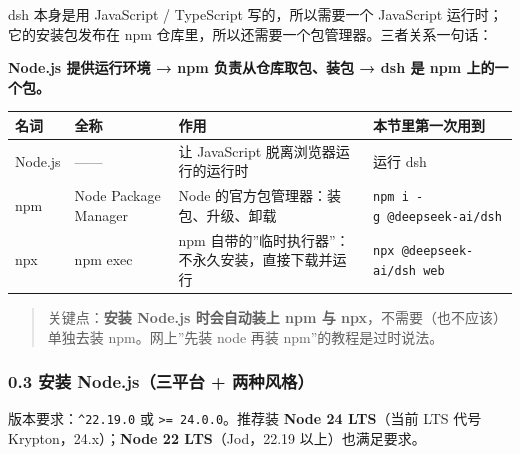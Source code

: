 dsh 本身是用 JavaScript / TypeScript 写的，所以需要一个 JavaScript
运行时；它的安装包发布在 npm
仓库里，所以还需要一个包管理器。三者关系一句话：

\textbf{Node.js 提供运行环境 → npm 负责从仓库取包、装包 → dsh 是 npm
上的一个包。}

{\def\LTcaptype{none} %
\begin{longtable}[]{@{}
  >{\raggedright\arraybackslash}p{}
  >{\raggedright\arraybackslash}p{}
  >{\raggedright\arraybackslash}p{}
  >{\raggedright\arraybackslash}p{}@{}}
\toprule\noalign{}
\begin{minipage}[b]{\linewidth}\raggedright
名词
\end{minipage} & \begin{minipage}[b]{\linewidth}\raggedright
全称
\end{minipage} & \begin{minipage}[b]{\linewidth}\raggedright
作用
\end{minipage} & \begin{minipage}[b]{\linewidth}\raggedright
本节里第一次用到
\end{minipage} \\
\midrule\noalign{}
\endhead
\bottomrule\noalign{}
\endlastfoot
Node.js & ------ & 让 JavaScript 脱离浏览器运行的运行时 & 运行 dsh \\
npm & Node Package Manager & Node 的官方包管理器：装包、升级、卸载 &
\texttt{npm\ i\ -g\ @deepseek-ai/dsh} \\
npx & npm exec & npm 自带的''临时执行器''：不永久安装，直接下载并运行 &
\texttt{npx\ @deepseek-ai/dsh\ web} \\
\end{longtable}
}

\begin{quote}
关键点：\textbf{安装 Node.js 时会自动装上 npm 与
npx}，不需要（也不应该）单独去装 npm。网上''先装 node 再装
npm''的教程是过时说法。
\end{quote}

\subsubsection{0.3 安装 Node.js（三平台 +
两种风格）}\label{ux5b89ux88c5-node.jsux4e09ux5e73ux53f0-ux4e24ux79cdux98ceux683c}

版本要求：\texttt{\^{}22.19.0} 或
\texttt{\textgreater{}=\ 24.0.0}。推荐装 \textbf{Node 24 LTS}（当前 LTS
代号 Krypton，24.x）；\textbf{Node 22 LTS}（Jod，22.19
以上）也满足要求。

